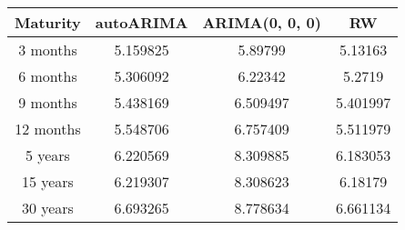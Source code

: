 \begin{tabular}{||c c c c||} 
    \hline
    Maturity & autoARIMA & ARIMA(0, 0, 0) & RW \\ [0.5ex] 
    \hline\hline
    3 months & 5.159825 & 5.89799 & 5.13163 \\ 
    \hline
    6 months & 5.306092 & 6.22342 & 5.2719 \\
    \hline
    9 months & 5.438169 & 6.509497 & 5.401997 \\
    \hline
    12 months & 5.548706 & 6.757409 & 5.511979 \\
    \hline
    5 years & 6.220569 & 8.309885 & 6.183053 \\
    \hline
    15 years & 6.219307 & 8.308623 & 6.18179 \\ [1ex] 
    \hline
    30 years & 6.693265 & 8.778634 & 6.661134 \\ [1ex] 
    \hline
\end{tabular}